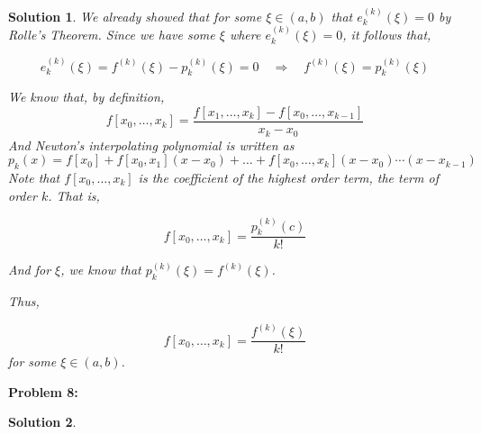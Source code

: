 \documentclass[12pt, letterpaper]{article}
\theoremstyle{nonumberplain}
\newtheorem{sol}{Solution}
\begin{document}
\begin{sol}
	We already showed that for some $\xi\in (a, b)$ that $e_k^{(k)}(\xi) = 0$ by Rolle's Theorem. Since we have some $\xi$ where $e_k^{(k)}(\xi) = 0$, it follows that,

	$$e_k^{(k)}(\xi) = f^{(k)}(\xi) - p_k^{(k)}(\xi) = 0 \quad \Rightarrow \quad f^{(k)}(\xi) = p_k^{(k)}(\xi)$$

	We know that, by definition, $$f[x_0, \ldots, x_k] = \frac{f[x_1, \ldots, x_k] - f[x_0, \ldots, x_{k-1}]}{x_k - x_0}$$
	And Newton's interpolating polynomial is written as $$p_k(x) = f[x_0] + f[x_0, x_1](x - x_0) + \ldots + f[x_0, \ldots, x_k](x - x_0)\cdots(x - x_{k-1}) $$
	Note that $f[x_0, \ldots, x_k]$ is the coefficient of the highest order term, the term of order $k$. That is,

	$$f[x_0, \ldots, x_k] = \frac{p_k^{(k)}(c)}{k!}$$

	And for $\xi$, we know that $p_k^{(k)}(\xi) = f^{(k)}(\xi)$.

	Thus,

	$$f[x_0, \dots, x_k] = \frac{f^{(k)}(\xi)}{k!}$$
	for some $\xi\in (a, b)$.
\end{sol}

\newpage

\hspace{18pt}\textbf{Problem 8:} \medskip
\begin{sol}

\end{sol}
\end{document}

